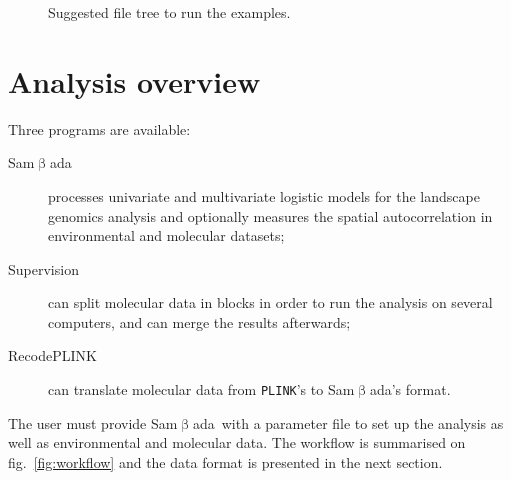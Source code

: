 \documentclass[a4paper,11pt]{article}
\newcommand{\smb}{\textsf{Sam$\upbeta$ada}}
\newcommand{\prog}[1]{\texttt{#1}}
\begin{document}
\begin{figure}[htbp]
\caption{Suggested file tree to run the examples.}
\label{fig:filetree}
\end{figure}

\clearpage

\section{Analysis overview}

Three programs are available:
\begin{description}
\item[\smb] processes univariate and multivariate logistic models for the landscape genomics analysis and optionally measures the spatial autocorrelation in environmental and molecular datasets;
\item[Supervision] can split molecular data in blocks in order to run the analysis on several computers, and can merge the results afterwards;
\item[RecodePLINK] can translate molecular data from \prog{PLINK}'s to \smb's format.
\end{description}

The user must provide \smb\ with a parameter file to set up the analysis as well as environmental and molecular data.
The workflow is summarised on fig.~\ref{fig:workflow} and the data format is presented in the next section.
\end{document}

